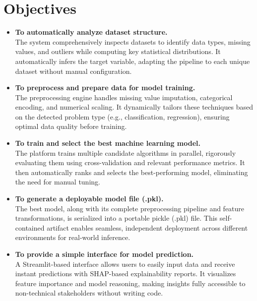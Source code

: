 \section{Objectives}
\begin{itemize}
\item \textbf{To automatically analyze dataset structure.}\\
The system comprehensively inspects datasets to identify data types, missing values, and outliers while computing key statistical distributions. It automatically infers the target variable, adapting the pipeline to each unique dataset without manual configuration.\vspace{0.15cm}

\item \textbf{To preprocess and prepare data for model training.}\\
The preprocessing engine handles missing value imputation, categorical encoding, and numerical scaling. It dynamically tailors these techniques based on the detected problem type (e.g., classification, regression), ensuring optimal data quality before training.\vspace{0.15cm}

\item \textbf{To train and select the best machine learning model.}\\
The platform trains multiple candidate algorithms in parallel, rigorously evaluating them using cross-validation and relevant performance metrics. It then automatically ranks and selects the best-performing model, eliminating the need for manual tuning.\vspace{0.15cm}

\item \textbf{To generate a deployable model file (.pkl).}\\
The best model, along with its complete preprocessing pipeline and feature transformations, is serialized into a portable pickle (.pkl) file. This self-contained artifact enables seamless, independent deployment across different environments for real-world inference.\vspace{0.15cm}

\item \textbf{To provide a simple interface for model prediction.}\\
A Streamlit-based interface allows users to easily input data and receive instant predictions with SHAP-based explainability reports. It visualizes feature importance and model reasoning, making insights fully accessible to non-technical stakeholders without writing code.
\end{itemize}


